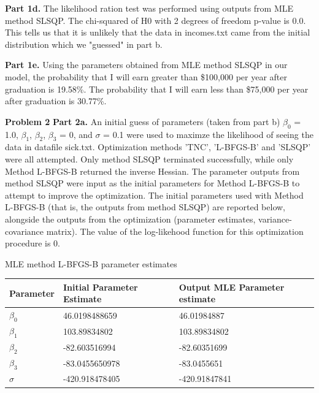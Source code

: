 \documentclass[letterpaper,12pt]{article}
\theoremstyle{definition}
\begin{document}
\noindent\newline\textbf{Part 1d.} The likelihood ration test was performed using outputs from MLE method SLSQP. The chi-squared of H0 with 2 degrees of freedom p-value is 0.0. This tells us that it is unlikely that the data in incomes.txt came from the initial distribution which we "guessed" in part b.

\noindent\newline\textbf{Part 1e.} Using the parameters obtained from MLE method SLSQP in our model, the probability that I will earn greater than \$100,000 per year after graduation is 19.58\%. The probability that I will earn less than \$75,000 per year after graduation is 30.77\%.


\noindent\newline\textbf{Problem 2}
\noindent\newline\textbf{Part 2a.} An initial guess of parameters (taken from part b) $\beta_{0}$ = 1.0, $\beta_{1}$, $\beta_{2}$, $\beta_{3}$ = 0, and $\sigma$  = 0.1 were used to maximze the likelihood of seeing the data in datafile sick.txt.  Optimization methods 'TNC', 'L-BFGS-B' and 'SLSQP' were all attempted. Only method SLSQP terminated successfully, while only Method L-BFGS-B returned the inverse Hessian. The parameter outputs from method SLSQP were input as the initial parameters for Method L-BFGS-B to attempt to improve the optimization. The initial parameters used with Method L-BFGS-B (that is, the outputs from method SLSQP) are reported below, alongside the outputs from the optimization (parameter estimates, variance-covariance matrix). The value of the log-likehood function for this optimization procedure is 0.

\begin{center}
    \caption{MLE method L-BFGS-B parameter estimates}
    \begin{tabular}{ | l | l | l |}
    \hline
    Parameter & Initial Parameter Estimate & Output MLE Parameter estimate \\ \hline
    $\beta_{0}$ & 46.0198488659  & 46.01984887  \\ \hline
    $\beta_{1}$ & 103.89834802 & 103.89834802 \\ \hline
    $\beta_{2}$ & -82.603516994  & -82.60351699 \\ \hline
    $\beta_{3}$ & -83.0455650978  & -83.0455651 \\ \hline
    $\sigma$  & -420.918478405 & -420.91847841 \\ \hline
    \end{tabular}
\end{center}
\end{document}
